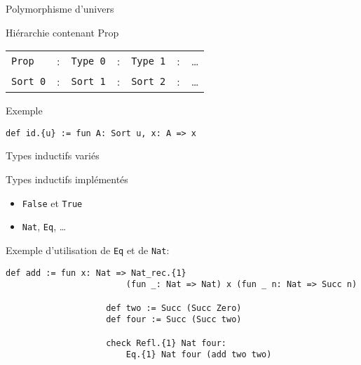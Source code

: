 \documentclass[12pt, aspectratio=169]{beamer}
\begin{document}
        \begin{frame}[fragile]{Polymorphisme d'univers}

            \begin{block}{Hiérarchie contenant Prop}

                \begin{tabular}{lclclcl}
                    \texttt{Prop} &:& \texttt{Type 0} &:& \texttt{Type 1} &:& \dots \\
                    \texttt{Sort 0} &:& \texttt{Sort 1} &:& \texttt{Sort 2} &:& \dots
                \end{tabular}

            \end{block}

            \vfill

            \begin{exampleblock}{Exemple}

                \begin{lstlisting}[language=mdln]
                    def id.{u} := fun A: Sort u, x: A => x
                \end{lstlisting}

            \end{exampleblock}

        \end{frame}

        \begin{frame}[fragile]{Types inductifs variés}

            \begin{exampleblock}{Types inductifs implémentés}

                \begin{itemize}
                    \item \lstinline{False} et \lstinline{True}
                    \item \lstinline{Nat}, \lstinline{Eq}, \dots
                \end{itemize}

            \end{exampleblock} \pause

            \begin{exampleblock}{Exemple d'utilisation de \lstinline{Eq} et de \lstinline{Nat}:}

                \begin{lstlisting}[language=mdln]
                    def add := fun x: Nat => Nat_rec.{1}
                        (fun _: Nat => Nat) x (fun _ n: Nat => Succ n)

                    def two := Succ (Succ Zero)
                    def four := Succ (Succ two)

                    check Refl.{1} Nat four:
                        Eq.{1} Nat four (add two two)
                \end{lstlisting}

            \end{exampleblock}

        \end{frame}
\end{document}
